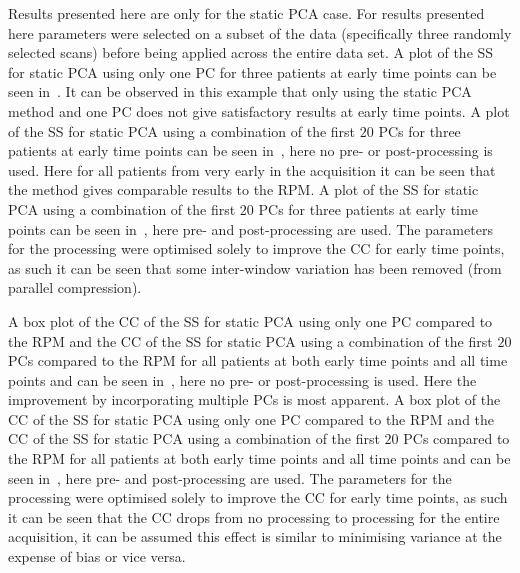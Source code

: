     Results presented here are only for the static \gls{PCA} case. For results presented here parameters were selected on a subset of the data (specifically three randomly selected scans) before being applied across the entire data set. A plot of the \gls{SS} for static \gls{PCA} using only one \gls{PC} for three patients at early time points can be seen in~. It can be observed in this example that only using the static \gls{PCA} method and one \gls{PC} does not give satisfactory results at early time points. A plot of the \gls{SS} for static \gls{PCA} using a combination of the first $20$ \glspl{PC} for three patients at early time points can be seen in~, here no pre- or post-processing is used. Here for all patients from very early in the acquisition it can be seen that the method gives comparable results to the \gls{RPM}. A plot of the \gls{SS} for static \gls{PCA} using a combination of the first $20$ \glspl{PC} for three patients at early time points can be seen in~, here pre- and post-processing are used. The parameters for the processing were optimised solely to improve the \gls{CC} for early time points, as such it can be seen that some inter-window variation has been removed (from parallel compression).
    
    A box plot of the \gls{CC} of the \gls{SS} for static \gls{PCA} using only one \gls{PC} compared to the \gls{RPM} and the \gls{CC} of the \gls{SS} for static \gls{PCA} using a combination of the first $20$ \glspl{PC} compared to the \gls{RPM} for all patients at both early time points and all time points and  can be seen in~, here no pre- or post-processing is used. Here the improvement by incorporating multiple \glspl{PC} is most apparent. A box plot of the \gls{CC} of the \gls{SS} for static \gls{PCA} using only one \gls{PC} compared to the \gls{RPM} and the \gls{CC} of the \gls{SS} for static \gls{PCA} using a combination of the first $20$ \glspl{PC} compared to the \gls{RPM} for all patients at both early time points and all time points and  can be seen in~, here pre- and post-processing are used. The parameters for the processing were optimised solely to improve the \gls{CC} for early time points, as such it can be seen that the \gls{CC} drops from no processing to processing for the entire acquisition, it can be assumed this effect is similar to minimising variance at the expense of bias or vice versa.
